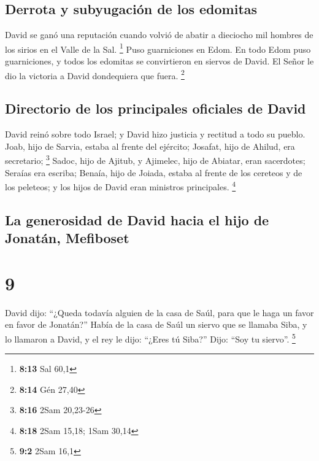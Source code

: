 \hypertarget{derrota-y-subyugaciuxf3n-de-los-edomitas}{%
\subsection{Derrota y subyugación de los
edomitas}\label{derrota-y-subyugaciuxf3n-de-los-edomitas}}

 David se ganó una reputación cuando volvió de abatir a
dieciocho mil hombres de los sirios en el Valle de la Sal. \footnote{\textbf{8:13}
  Sal 60,1}  Puso guarniciones en Edom. En todo Edom puso
guarniciones, y todos los edomitas se convirtieron en siervos de David.
El Señor le dio la victoria a David dondequiera que fuera. \footnote{\textbf{8:14}
  Gén 27,40}

\hypertarget{directorio-de-los-principales-oficiales-de-david}{%
\subsection{Directorio de los principales oficiales de
David}\label{directorio-de-los-principales-oficiales-de-david}}

 David reinó sobre todo Israel; y David hizo justicia y
rectitud a todo su pueblo.  Joab, hijo de Sarvia, estaba
al frente del ejército; Josafat, hijo de Ahilud, era secretario;
\footnote{\textbf{8:16} 2Sam 20,23-26}  Sadoc, hijo de
Ajitub, y Ajimelec, hijo de Abiatar, eran sacerdotes; Seraías era
escriba;  Benaía, hijo de Joiada, estaba al frente de los
cereteos y de los peleteos; y los hijos de David eran ministros
principales. \footnote{\textbf{8:18} 2Sam 15,18; 1Sam 30,14}

\hypertarget{la-generosidad-de-david-hacia-el-hijo-de-jonatuxe1n-mefiboset}{%
\subsection{La generosidad de David hacia el hijo de Jonatán,
Mefiboset}\label{la-generosidad-de-david-hacia-el-hijo-de-jonatuxe1n-mefiboset}}

\hypertarget{section-8}{%
\section{9}\label{section-8}}

 David dijo: ``¿Queda todavía alguien de la casa de Saúl,
para que le haga un favor en favor de Jonatán?''  Había de
la casa de Saúl un siervo que se llamaba Siba, y lo llamaron a David, y
el rey le dijo: ``¿Eres tú Siba?'' Dijo: ``Soy tu siervo''. \footnote{\textbf{9:2}
  2Sam 16,1}

